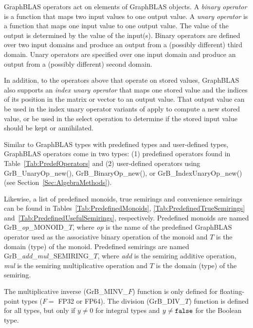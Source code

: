 GraphBLAS operators act on elements of GraphBLAS objects. A \emph{binary
operator} is a function that maps two input values to one output value. A
\emph{unary operator} is a function that maps one input value to one
output value. The value of the output is determined by the value of
the input(s).  Binary operators are defined over two input domains
and produce an output from a (possibly different) third domain. Unary
operators are specified over one input domain and produce an output from a
(possibly different) second domain.

{\color{red}
In addition, to the operators above that operate on stored values, GraphBLAS
also supports an \emph{index unary operator} that maps one
stored value and the indices of its position in the matrix or vector to an output value.
That output value can be used in the index unary operator variants of apply to compute a
new stored value, or be used in the select operation to determine if the
stored input value should be kept or annihilated.
}

Similar to GraphBLAS types with predefined types and user-defined types,
GraphBLAS operators come in two types: (1) predefined operators found
in Table~\ref{Tab:PredefOperators} and (2) user-defined operators
using {\sf GrB\_UnaryOp\_new()}, {\sf GrB\_BinaryOp\_new()}, or 
{\sf GrB\_IndexUnaryOp\_new()} (see Section~\ref{Sec:AlgebraMethods}). 

Likewise, a list of predefined monoids, true semirings and convenience
semirings can be found in Tables~\ref{Tab:PredefinedMonoids},
\ref{Tab:PredefinedTrueSemirings} and~\ref{Tab:PredefinedUsefulSemirings},
respectively.  Predefined monoids are named {\sf
GrB\_\emph{op}\_MONOID\_$T$}, where \emph{op} is the name of the
predefined GraphBLAS operator used as the associative binary operation
of the monoid and $T$ is the domain (type) of the monoid.  Predefined
semirings are named {\sf GrB\_\emph{add}\_\emph{mul}\_SEMIRING\_$T$},
where \emph{add} is the semiring additive operation, \emph{mul} is
the semiring multiplicative operation and $T$ is the domain (type)
of the semiring.

The multiplicative inverse ({\sf GrB\_MINV\_$F$}) function is only defined
for floating-point types ($F = $ {\sf FP32} or {\sf FP64}).  The division
({\sf GrB\_DIV\_$T$}) function is defined for all types, but only if $y
\neq 0$ for integral types and $y \neq {\tt false}$ for the Boolean type.



